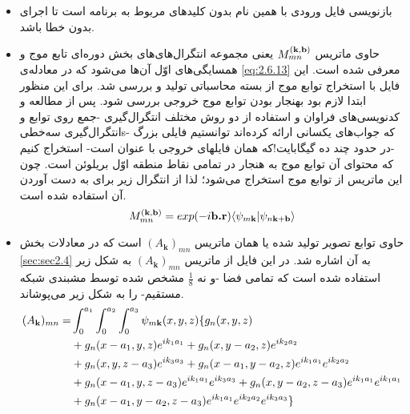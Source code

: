 \begin{itemize}
 \item{}
 بازنویسی فایل ورودی با همین نام بدون کلید‌های مربوط به برنامه  است تا اجرای  بدون خطا باشد.
 \item{}
 حاوی ماتریس $M_{mn}^{(\bf{k,b})}$ یعنی مجموعه انتگرال‌های‌های بخش دوره‌ای تابع موج و همسایگی‌های اوّل آن‌ها 
می‌شود که در معادله‌ی \ref{eq:2.6.13} معرفی شده است. این فایل با استخراج توابع موج از بسته محاسباتی  تولید و بررسی شد. برای این منظور ابتدا لازم بود 
بهنجار بودن توابع موج خروجی  بررسی شود. پس از مطالعه و کدنویسی‌های فراوان و استفاده از دو روش مختلف انتگرال‌گیری -جمع روی توابع و \glspl{انتگرال‌گیری 
سه‌خطی}\cite{trilinear}- که جواب‌های یکسانی ارائه کرده‌اند توانستیم فایلی بزرگ -در حدود چند ده گیگابایت!که همان فایلهای خروجی   با عنوان 
است- استخراج کنیم که محتوای آن توابع موج به هنجار در تمامی نقاط منطقه اوّل بریلوئن است. چون این ماتریس از توابع موج استخراج می‌شود؛ لذا از انتگرال زیر برای به 
دست آوردن آن استفاده شده است.\cite{Marzari1997}
  \begin{equation}
 M_{mn}^{(\bf{k,b})}=exp(-i\textbf{b.r})\langle\psi_{m{\bf k}}|\psi_{n{\bf k}+{\bf b}}\rangle
 \end{equation}
 \item{}
 حاوی توابع تصویر تولید شده یا همان ماتریس $(A_{\mathbf{k}})_{mn}$ است که در معادلات بخش \ref{sec:sec2.4} به آن اشاره شد. در این فایل از ماتریس  
$(A_{\mathbf{k}})_{mn}$ 
به شکل زیر استفاده شده است که تمامی فضا -و نه $\frac{1}{8}$ مشخص شده توسط مشبندی شبکه مستقیم- را به شکل زیر می‌پوشاند.
 \begin{align}\label{eq:4.3.3}
  (A_{{\mathbf k}})_{mn}=& \int_{0}^{a_{1}}\int_{0}^{a_{2}}\int_{0}^{a_{3}}\psi_{m{\bf k}}(x,y,z) \{ g_{n}(x,y,z)\nonumber\\
  & +  g_{n}(x-a_{1},y,z)e^{ik_{1}a_{1}}  +  g_{n}(x,y-a_{2},z)e^{ik_{2}a_{2}}\nonumber\\
  &  +  g_{n}(x,y,z-a_{3})e^{ik_{3}a_{3}}  +  g_{n}(x-a_{1},y-a_{2},z)e^{ik_{1}a_{1}}e^{ik_{2}a_{2}}\nonumber\\
  &  +  g_{n}(x-a_{1},y,z-a_{3})e^{ik_{1}a_{1}}e^{ik_{3}a_{3}}+  g_{n}(x,y-a_{2},z-a_{3})e^{ik_{1}a_{1}}e^{ik_{1}a_{1}}\nonumber\\
  &  +  g_{n}(x-a_{1},y-a_{2},z-a_{3})e^{ik_{1}a_{1}}e^{ik_{2}a_{2}}e^{ik_{3}a_{3}} \}
 \end{align}

\end{itemize}
